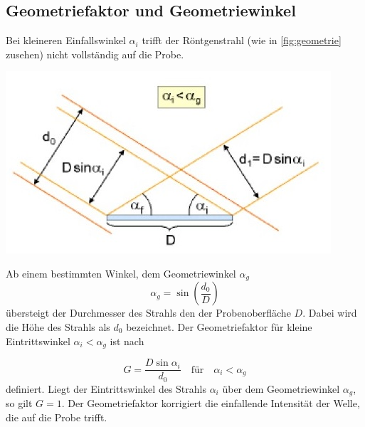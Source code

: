 \subsection{Geometriefaktor und Geometriewinkel}
Bei kleineren Einfallswinkel $\alpha_i$ trifft der Röntgenstrahl (wie in \autoref{fig:geometrie} zusehen) nicht vollständig auf die Probe.

\begin{minipage}{0.5\textwidth}
    \includegraphics[width=\textwidth]{content/data/geometriefaktor.jpg}
    \label{fig:geometrie}
\end{minipage}
\begin{minipage}{0.5\textwidth}
    Ab einem bestimmten Winkel, dem Geometriewinkel $\alpha_g$
    \begin{equation}
        \alpha_g = \sin \left ( \frac{d_0}{D} \right )
        \label{eq:geometriewinkel}
    \end{equation}
    übersteigt der Durchmesser des Strahls den der Probenoberfläche $D$.
    Dabei wird die Höhe des Strahls als $d_0$ bezeichnet.
    Der Geometriefaktor für kleine Eintrittswinkel $\alpha_i < \alpha_g$ ist nach
\end{minipage}
\begin{equation}
    G = \frac{D \sin \alpha_i}{d_0} \quad \text{für} \quad \alpha_i < \alpha_g
    \label{eqn:geometriefaktor}
\end{equation}
definiert.
Liegt der Eintrittswinkel des Strahls $\alpha_i$ über dem Geometriewinkel $\alpha_g$, so gilt $G=1$.
Der Geometriefaktor korrigiert die einfallende Intensität der Welle, die auf die Probe trifft.
